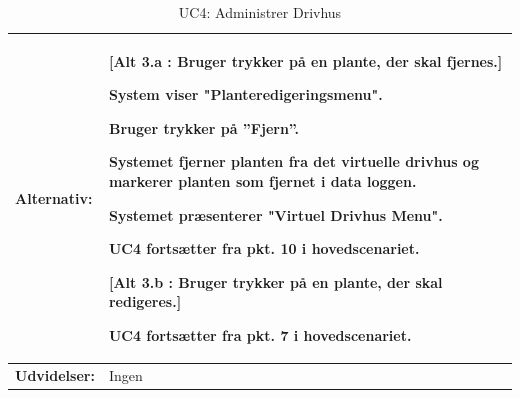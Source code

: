 \begin{table}[h]
\begin{tabularx}{\textwidth}{| >{\raggedright\arraybackslash}p{3.3 cm} | >{\raggedright\arraybackslash}X |}
\textbf{Alternativ:}				& 
\textbf{{[}Alt 3.a : Bruger trykker på en plante, der skal fjernes.{]}}
\begin{packed_enum}
\setcounter{enumi}{3}
\item System viser "Planteredigeringsmenu".
\item Bruger trykker på ”Fjern”.
\item Systemet fjerner planten fra det virtuelle drivhus og markerer planten som fjernet i data loggen.
\item Systemet præsenterer "Virtuel Drivhus Menu".
\item UC4 fortsætter fra pkt. 10 i hovedscenariet.
\end{packed_enum}
\textbf{{[}Alt 3.b : Bruger trykker på en plante, der skal redigeres.{]}}
\begin{packed_enum}
\setcounter{enumi}{3}
\item UC4 fortsætter fra pkt. 7 i hovedscenariet.
\end{packed_enum}
\\ \hline

\textbf{Udvidelser:}				&  
Ingen
\\ \hline
\end{tabularx}
\caption{UC4: Administrer Drivhus}
\label{tbl:UC4}
\end{table}

\clearpage


